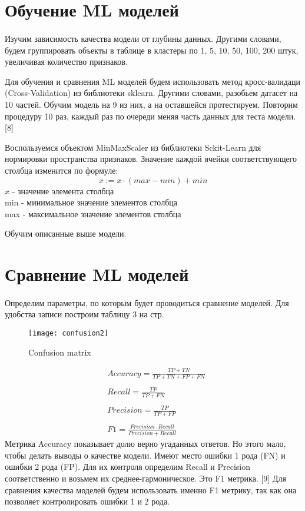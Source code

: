 \documentclass{article}
\begin{document}
	\section{Обучение ML моделей}
	\paragraph{}
	Изучим зависимость качества модели от глубины данных. Другими словами, будем группировать объекты в таблице в кластеры по 1, 5, 10, 50, 100, 200 штук, увеличивая количество признаков.
	
	
	Для обучения и сравнения ML моделей будем использовать метод кросс-валидаци (Cross-Validation) из библиотеки sklearn. Другими словами, разобьем датасет на 10 частей. Обучим модель на 9 из них, а на оставшейся протестируем. Повторим процедуру 10 раз, каждый раз по очереди меняя часть данных для теста модели. [8]
	
	Воспользуемся объектом MinMaxScaler из библиотеки Sckit-Learn для нормировки пространства признаков. Значение каждой ячейки соответствующего столбца изменится по формуле:
	\[x:=x \cdot (max-min)+min\]
	$x$ - значение элемента столбца\\
	min - минимальное значение элементов столбца\\
	max - максимальное значение элементов столбца
	
	
	Обучим описанные выше модели.
	\section{Сравнение ML моделей}
	\paragraph{}
	Определим параметры, по которым будет проводиться сравнение моделей. Для удобства записи построим таблицу 3 на стр. \pageref{confusion}
	\begin{figure}[h]
		\label{confusion}
		\texttt{[image: confusion2]}
		\caption{Confusion matrix}
	\end{figure}
	\begin{align*}
		&Accuracy = \frac{TP+TN}{TP+TN+FP+FN}\\
		\\
		&Recall = \frac{TP}{TP+FN}\\
		\\
		&Precision = \frac{TP}{TP+FP}\\
		\\
		& F1 = \frac{Precision\cdot Recall}{Precision + Recall}
	\end{align*}
	Метрика Accuracy показывает долю верно угаданных ответов. Но этого мало, чтобы делать выводы о качестве модели. Имеют место ошибки 1 рода (FN) и ошибки 2 рода (FP). Для их контроля определим Recall и Precision соответственно и возьмем их среднее-гармоническое. Это F1 метрика. [9] Для сравнения качества моделей будем использовать именно F1 метрику, так как она позволяет контролировать ошибки 1 и 2 рода.
\end{document}
